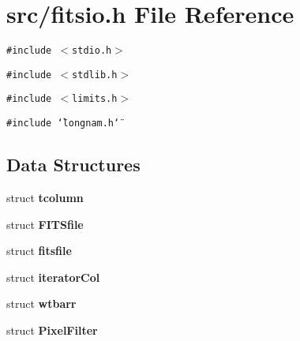 \section{src/fitsio.h File Reference}
\label{src_2fitsio_8h}
{\tt \#include $<$stdio.h$>$}\par
{\tt \#include $<$stdlib.h$>$}\par
{\tt \#include $<$limits.h$>$}\par
{\tt \#include \char`\"{}longnam.h\char`\"{}}\par
\subsection*{Data Structures}
\begin{CompactItemize}
\item 
struct \bf{tcolumn}
\item 
struct \bf{FITSfile}
\item 
struct \bf{fitsfile}
\item 
struct \bf{iterator\-Col}
\item 
struct \bf{wtbarr}
\item 
struct \bf{Pixel\-Filter}
\end{CompactItemize}
